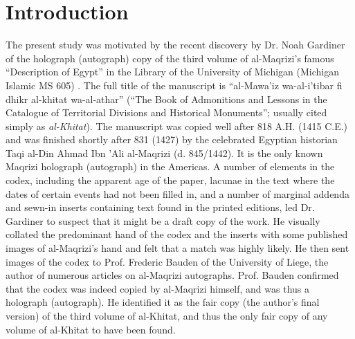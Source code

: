 \documentclass[conference,a4paper,twocolumn]{IEEEtran}
\begin{document}

%
\IEEEpeerreviewmaketitle


\section{Introduction}
\label{sec:introduction}
The present study was motivated by the recent discovery by Dr. Noah Gardiner of the holograph (autograph) copy of the third volume of al-Maqrizi's famous ``Description of Egypt'' in the Library of the University of Michigan (Michigan Islamic MS 605) \cite{Noah}. The full title of the manuscript is ``al-Mawa'iz wa-al-i'tibar fi dhikr al-khitat wa-al-athar'' (``The Book of Admonitions and Lessons in the Catalogue of Territorial Divisions and Historical Monuments''; usually cited simply as \textit{al-Khitat}). The manuscript was copied well after 818 A.H. (1415 C.E.) and was finished shortly after 831 (1427) by the celebrated Egyptian historian Taqi al-Din Ahmad Ibn 'Ali al-Maqrizi (d. 845/1442). It is the only known Maqrizi holograph (autograph) in the Americas. A number of elements in the codex, including the apparent age of the paper, lacunae in the text where the dates of certain events had not been filled in, and a number of marginal addenda and sewn-in inserts containing text found in the printed editions, led Dr. Gardiner to suspect that it might be a draft copy of the work. He visually collated the predominant hand of the codex and the inserts with some published images of al-Maqrizi's hand and felt that a match was highly likely. He then sent images of the codex to Prof. Frederic Bauden of the University of Liege, the author of numerous articles on al-Maqrizi autographs. Prof. Bauden confirmed that the codex was indeed copied by al-Maqrizi himself, and was thus a holograph (autograph). He identified it as the fair copy (the author's final version) of the third volume of al-Khitat, and thus the only fair copy of any volume of al-Khitat to have been found.
\end{document}
